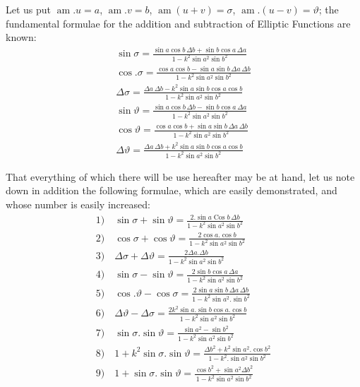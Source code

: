 \documentclass{article}
\begin{document}
Let us put $\operatorname{am}.u=a$, $\operatorname{am}.v=b$, $\operatorname{am}(u+v)=\sigma$, $\operatorname{am}.(u-v)=\vartheta$; the fundamental formulae for the addition and subtraction of Elliptic Functions are known:
\[
\begin{gathered}
\sin\sigma=\frac{\sin a\cos b\,\Delta b+\sin b\cos a\,\Delta a}{1-k^{2}\sin a^{2}\sin b^{2}}\\[1ex]
\cos.\sigma=\frac{\cos a\cos b-\sin a\sin b\,\Delta a\,\Delta b}{1-k^{2}\sin a^{2}\sin b^{2}}\\[1ex]
\Delta\sigma=\frac{\Delta a\,\Delta b-k^{2}\sin a\sin b\cos a\cos b}{1-k^{2}\sin a^{2}\sin b^{2}}\\[1ex]
\sin\vartheta=\frac{\sin a\cos b\,\Delta b-\sin b\cos a\,\Delta a}{1-k^{2}\sin a^{2}\sin b^{2}}\\[1ex]
\cos\vartheta=\frac{\cos a\cos b+\sin a\sin b\,\Delta a\,\Delta b}{1-k^{2}\sin a^{2}\sin b^{2}}\\[1ex]
\Delta\vartheta=\frac{\Delta a\,\Delta b+k^{2}\sin a\sin b\cos a\cos b}{1-k^{2}\sin a^{2}\sin b^{2}}
\end{gathered}
\]

That everything of which there will be use hereafter may be at hand, let us note down in addition the following formulae, which are easily demonstrated, and whose number is easily increased:
\[
\begin{gathered}
\text{1)}\quad\sin\sigma+\sin\vartheta=\frac{2.\sin a\operatorname{Cos}b\,\Delta b}{1-k^{2}\sin a^{2}\sin b^{2}}\\[1ex]
\text{2)}\quad\cos\sigma+\cos\vartheta=\frac{2\cos a.\cos b}{1-k^{2}\sin a^{2}\sin b^{2}}\\[1ex]
\text{3)}\quad\Delta\sigma+\Delta\vartheta=\frac{2\Delta a.\Delta b}{1-k^{2}\sin a^{2}\sin b^{2}}\\[1ex]
\text{4)}\quad\sin\sigma-\sin\vartheta=\frac{2\sin b\cos a\,\Delta a}{1-k^{2}\sin a^{2}\sin b^{2}}\\[1ex]
\text{5)}\quad\cos.\vartheta-\cos\sigma=\frac{2\sin a\sin b\,\Delta a\,\Delta b}{1-k^{2}\sin a^{2}.\sin b^{2}}\\[1ex]
\text{6)}\quad\Delta\vartheta-\Delta\sigma=\frac{2k^{2}\sin a.\sin b\cos a.\cos b}{1-k^{2}\sin a^{2}\sin b^{2}}\\[1ex]
\text{7)}\quad\sin\sigma.\sin\vartheta=\frac{\sin a^{2}-\sin b^{2}}{1-k^{2}\sin a^{2}\sin b^{2}}\\[1ex]
\text{8)}\quad1+k^{2}\sin\sigma.\sin\vartheta=\frac{\Delta b^{2}+k^{2}\sin a^{2}.\cos b^{2}}{1-k^{2}.\sin a^{2}\sin b^{2}}\\[1ex]
\text{9)}\quad1+\sin\sigma.\sin\vartheta=\frac{\cos b^{2}+\sin a^{2}\Delta b^{2}}{1-k^{2}\sin a^{2}\sin b^{2}}
\end{gathered}
\]
\end{document}
